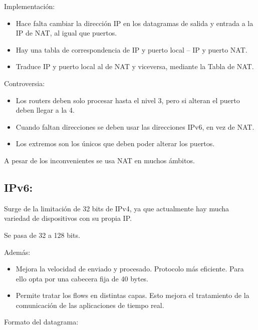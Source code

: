 \documentclass[12pt, twoside, openright]{report} %
\begin{document}
Implementación:

\begin{itemize}
	\item Hace falta cambiar la dirección IP en los datagramas de salida y
	      entrada a la IP de NAT, al igual que puertos.
	\item Hay una tabla de correspondencia de IP y puerto local -- IP y puerto
	      NAT.
	\item Traduce IP y puerto local al de NAT y viceversa, mediante la Tabla
	      de NAT.
\end{itemize}
\pagebreak

Controversia:

\begin{itemize}
	\item Los routers deben solo procesar hasta el nivel 3, pero si alteran el
	      puerto deben llegar a la 4.
	\item Cuando faltan direcciones se deben usar las direcciones IPv6, en vez
	      de NAT.
	\item Los extremos son los únicos que deben poder alterar los puertos.
\end{itemize}

A pesar de los inconvenientes se usa NAT en muchos ámbitos.


\subsection{IPv6:}



Surge de la limitación de 32 bits de IPv4, ya que actualmente hay
mucha variedad de dispositivos con su propia IP.

Se pasa de 32 a 128 bits.

Además:

\begin{itemize}
	\item Mejora la velocidad de enviado y procesado. Protocolo más eficiente.
	      Para ello opta por una cabecera fija de 40 bytes.
	\item Permite tratar los flows en distintas capas. Esto mejora el
	      tratamiento de la comunicación de las aplicaciones de tiempo real.
\end{itemize}

Formato del datagrama:
\begin{figure}[H]
	{\def\svgwidth{.9\textwidth}
		}
\end{figure}
\end{document}
